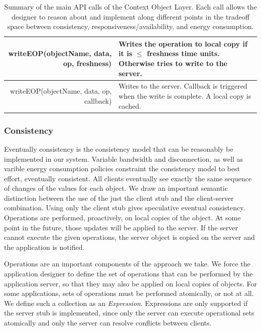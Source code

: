 \begin{table}
\begin{center}
\begin{tabular}{| r | p{9cm}  | }
    writeEOP(objectName, data, op, freshness) & Writes the operation to local copy if it is $\leq$ freshness time units.  Otherwise tries to write to the server. \\ \hline
    writeEOP(objectName, data, op, callback) & Writes to the server.  Callback is triggered when the write is complete.  A local copy is cached. \\
    \hline
  \end{tabular}
\caption{Summary of the main API calls of the Context Object Layer.  Each call allows the designer to reason about and implement
along different points in the tradeoff space between consistency, responsiveness/availability, and energy consumption.}
\label{tab:api}
\end{center}
\end{table}

\subsubsection{Consistency}
Eventually consistency is the consistency model that can be reasonably be implemented in our system.  Variable bandwidth and disconnection,
as well as varible energy consumption policies constraint the consistency model to best effort, eventually consistent.  All clients eventually
 see exactly the same sequence of changes of the values for each object.  We draw an important semantic distinction between the use
 of the just the client stub and the client-server combination.  Using only the client stub gives speculative eventual consistency.
 Operations are performed, proactively, on local copies of the object.  At some point in the future, those updates will be applied
 to the server.  If the server cannot execute the given operations, the server object is copied on the server and the application
 is notified.

 Operations are an important components of the approach we take.  We force the application designer to define the set of operations
 that can be performed by the application server, so that they may also be applied on local copies of objects.  For some applications, 
 sets of operations must be performed atomically, or not at all.  We define such a collection as an \emph{Expression}.  Expressions
 are only supported if the server stub is implemented, since only the server can execute operational sets atomically and
 only the server can resolve conflicts between clients.

